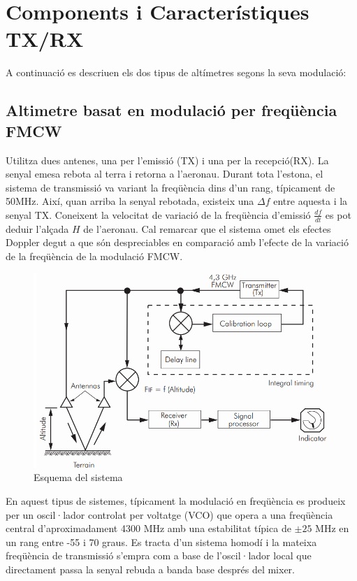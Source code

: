 \section{Components i Característiques TX/RX}
A continuació es descriuen els dos tipus de altímetres segons la seva modulació:
\subsection{Altimetre basat en modulació per freqüència FMCW}
Utilitza dues antenes, una per l'emissió (TX) i una per la recepció(RX). La senyal emesa rebota al terra i retorna a l'aeronau. Durant tota l'estona, el sistema de transmissió va variant la freqüència dins d'un rang, típicament de 50MHz. Així, quan arriba la senyal rebotada, existeix una $\Delta f$ entre aquesta i la senyal TX. Coneixent la velocitat de variació de la freqüència d'emissió $\frac{df}{dt}$ es pot deduir l'alçada $H$ de l'aeronau. Cal remarcar que el sistema omet els efectes Doppler degut a que són despreciables en comparació amb l'efecte de la variació de la freqüència de la modulació FMCW.
\begin{figure}[H]
	\centering
	\includegraphics[scale=0.3]{./img/FMCW.png}
	\caption{Esquema del sistema}
\end{figure}

En aquest tipus de sistemes, típicament la modulació en freqüència es produeix per un oscil·lador controlat per voltatge (VCO) que opera a una freqüència central d'aproximadament 4300 MHz amb una estabilitat típica de $\pm 25$ MHz en un rang entre -55 i 70 graus.
Es tracta d'un sistema homodí i la mateixa freqüència de transmissió s'empra com a base de l'oscil·lador local que directament passa la senyal rebuda a banda base després del mixer.

